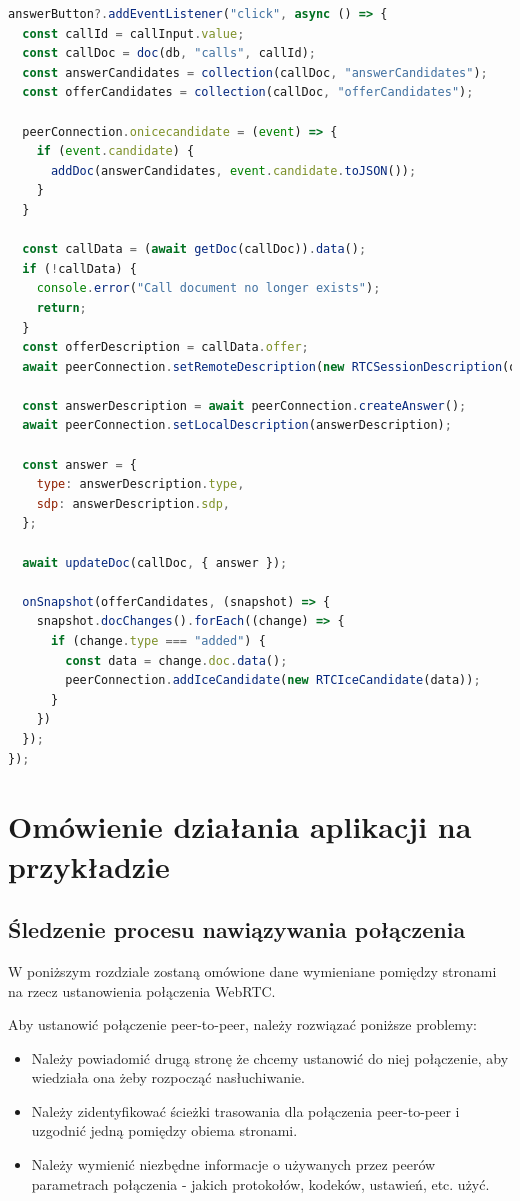 \begin{lstlisting}[language=Javascript,label=list:call-join, caption=Dołączanie do połączenia połączenia,
basicstyle=\footnotesize \ttfamily, showtabs=true, tabsize=4]
answerButton?.addEventListener("click", async () => {
  const callId = callInput.value;
  const callDoc = doc(db, "calls", callId);
  const answerCandidates = collection(callDoc, "answerCandidates");
  const offerCandidates = collection(callDoc, "offerCandidates");

  peerConnection.onicecandidate = (event) => {
    if (event.candidate) {
      addDoc(answerCandidates, event.candidate.toJSON());
    }
  }

  const callData = (await getDoc(callDoc)).data();
  if (!callData) {
    console.error("Call document no longer exists");
    return;
  }
  const offerDescription = callData.offer;
  await peerConnection.setRemoteDescription(new RTCSessionDescription(offerDescription));

  const answerDescription = await peerConnection.createAnswer();
  await peerConnection.setLocalDescription(answerDescription);

  const answer = {
    type: answerDescription.type,
    sdp: answerDescription.sdp,
  };

  await updateDoc(callDoc, { answer });

  onSnapshot(offerCandidates, (snapshot) => {
    snapshot.docChanges().forEach((change) => {
      if (change.type === "added") {
        const data = change.doc.data();
        peerConnection.addIceCandidate(new RTCIceCandidate(data));
      }
    })
  });
});
\end{lstlisting}

\section{Omówienie działania aplikacji na przykładzie}
\subsection{Śledzenie procesu nawiązywania połączenia}

W poniższym rozdziale zostaną omówione dane wymieniane pomiędzy stronami na rzecz ustanowienia połączenia WebRTC.


Aby ustanowić połączenie peer-to-peer, należy rozwiązać poniższe problemy: \cite{hpbn}

\begin{itemize}
	\item Należy powiadomić drugą stronę że chcemy ustanowić do niej połączenie, aby wiedziała ona żeby rozpocząć
	      nasłuchiwanie.
	\item Należy zidentyfikować ścieżki trasowania dla połączenia peer-to-peer i uzgodnić jedną pomiędzy obiema stronami.
	\item Należy wymienić niezbędne informacje o używanych przez peerów parametrach połączenia - jakich protokołów,
	      kodeków, ustawień, etc. użyć.
\end{itemize}

